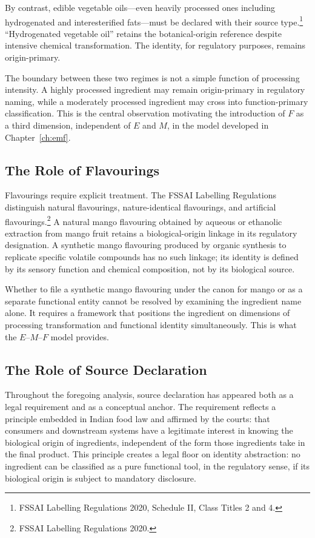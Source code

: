 \documentclass[12pt,a3paper]{article}
\begin{document}
By contrast, edible vegetable oils---even heavily processed ones including hydrogenated and interesterified fats---must be declared with their source type.\footnote{FSSAI Labelling Regulations 2020, Schedule II, Class Titles 2 and 4.} ``Hydrogenated vegetable oil'' retains the botanical-origin reference despite intensive chemical transformation. The identity, for regulatory purposes, remains origin-primary.

The boundary between these two regimes is not a simple function of processing intensity. A highly processed ingredient may remain origin-primary in regulatory naming, while a moderately processed ingredient may cross into function-primary classification. This is the central observation motivating the introduction of $F$ as a third dimension, independent of $E$ and $M$, in the model developed in Chapter~\ref{ch:emf}.

\subsection{The Role of Flavourings}

Flavourings require explicit treatment. The FSSAI Labelling Regulations distinguish natural flavourings, nature-identical flavourings, and artificial flavourings.\footnote{FSSAI Labelling Regulations 2020.} A natural mango flavouring obtained by aqueous or ethanolic extraction from mango fruit retains a biological-origin linkage in its regulatory designation. A synthetic mango flavouring produced by organic synthesis to replicate specific volatile compounds has no such linkage; its identity is defined by its sensory function and chemical composition, not by its biological source.

Whether to file a synthetic mango flavouring under the canon for mango or as a separate functional entity cannot be resolved by examining the ingredient name alone. It requires a framework that positions the ingredient on dimensions of processing transformation and functional identity simultaneously. This is what the $E$--$M$--$F$ model provides.

\subsection{The Role of Source Declaration}

Throughout the foregoing analysis, source declaration has appeared both as a legal requirement and as a conceptual anchor. The requirement reflects a principle embedded in Indian food law and affirmed by the courts: that consumers and downstream systems have a legitimate interest in knowing the biological origin of ingredients, independent of the form those ingredients take in the final product. This principle creates a legal floor on identity abstraction: no ingredient can be classified as a pure functional tool, in the regulatory sense, if its biological origin is subject to mandatory disclosure.
\end{document}
